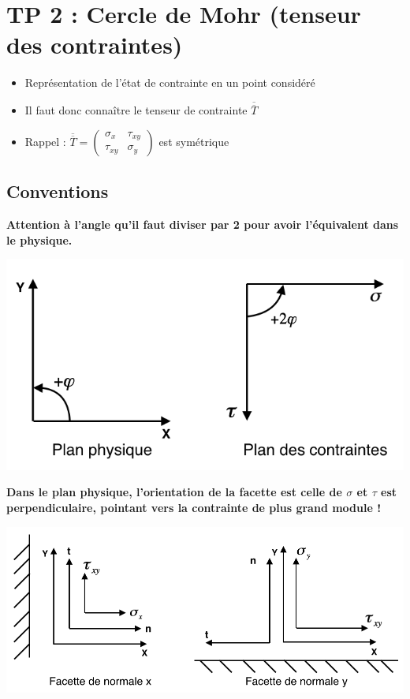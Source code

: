 
\section*{TP 2 : Cercle de Mohr (tenseur des contraintes)}
\begin{itemize}
	\item Représentation de l'état de contrainte en un point considéré
	\item Il faut donc connaître le tenseur de contrainte $\overline{\overline{T}}$
	\item Rappel : $\overline{\overline{T}} = 
	\left(	
	\begin{array}{cc}
	\sigma _x & \tau _{xy} \\ 
	\tau _{xy} & \sigma _y
	\end{array}
	\right) $ est symétrique
\end{itemize}

\subsection*{Conventions}
\noindent \textbf{Attention à l'angle qu'il faut diviser par 2 pour avoir l'équivalent dans le physique.}
\begin{center}
\includegraphics[scale=0.6]{tp2-1}
\end{center}

\textbf{Dans le plan physique, l'orientation de la facette est celle de $\sigma$ et $\tau$ est perpendiculaire, pointant vers la contrainte de plus grand module !}
\begin{center}
\includegraphics[scale=0.6]{tp2-2}
\end{center}

